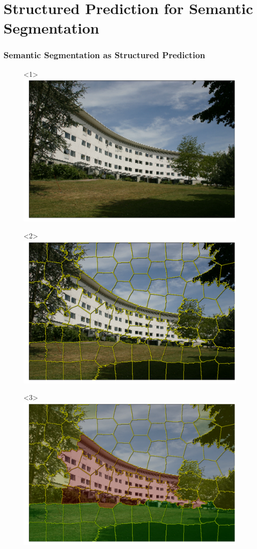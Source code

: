 \documentclass[final,ignorenonframetext,compress]{beamer}
\begin{document}
\section{Structured Prediction for Semantic Segmentation}
\begin{frame}
    \frametitle{Semantic Segmentation as Structured Prediction}
    \begin{figure}
        \begin{onlyenv}<1>
            \includegraphics[width=.6\linewidth]{images/scene_sp_org}%
        \end{onlyenv}%
        \begin{onlyenv}<2>
            \includegraphics[width=.6\linewidth]{images/scene_sp}%
        \end{onlyenv}%
        \begin{onlyenv}<3>
            \includegraphics[width=.6\linewidth]{images/scene_sp_gt}%
        \end{onlyenv}%

\end{figure}
\end{frame}
\end{document}
